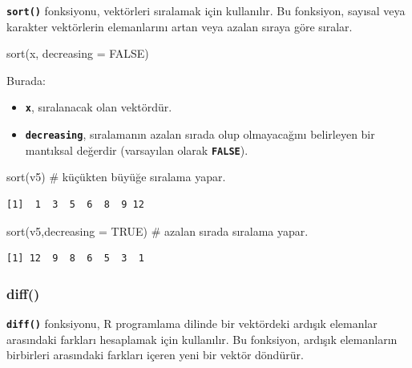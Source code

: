 \documentclass[
  letterpaper,
  DIV=11,
  numbers=noendperiod]{scrreprt}
\newenvironment{Shaded}{\begin{snugshade}}{\end{snugshade}}
\newcommand{\AttributeTok}[1]{\textcolor[rgb]{0.40,0.45,0.13}{#1}}
\newcommand{\CommentTok}[1]{\textcolor[rgb]{0.37,0.37,0.37}{#1}}
\newcommand{\ConstantTok}[1]{\textcolor[rgb]{0.56,0.35,0.01}{#1}}
\newcommand{\FunctionTok}[1]{\textcolor[rgb]{0.28,0.35,0.67}{#1}}
\newcommand{\NormalTok}[1]{\textcolor[rgb]{0.00,0.23,0.31}{#1}}
\begin{document}
\textbf{\texttt{sort()}} fonksiyonu, vektörleri sıralamak için
kullanılır. Bu fonksiyon, sayısal veya karakter vektörlerin elemanlarını
artan veya azalan sıraya göre sıralar.

\begin{Shaded}
\begin{Highlighting}[]
\FunctionTok{sort}\NormalTok{(x, }\AttributeTok{decreasing =} \ConstantTok{FALSE}\NormalTok{)}
\end{Highlighting}
\end{Shaded}

Burada:

\begin{itemize}
\item
  \textbf{\texttt{x}}, sıralanacak olan vektördür.
\item
  \textbf{\texttt{decreasing}}, sıralamanın azalan sırada olup
  olmayacağını belirleyen bir mantıksal değerdir (varsayılan olarak
  \textbf{\texttt{FALSE}}).
\end{itemize}

\begin{Shaded}
\begin{Highlighting}[]
\FunctionTok{sort}\NormalTok{(v5) }\CommentTok{\# küçükten büyüğe sıralama yapar.}
\end{Highlighting}
\end{Shaded}

\begin{verbatim}
[1]  1  3  5  6  8  9 12
\end{verbatim}

\begin{Shaded}
\begin{Highlighting}[]
\FunctionTok{sort}\NormalTok{(v5,}\AttributeTok{decreasing =} \ConstantTok{TRUE}\NormalTok{) }\CommentTok{\# azalan sırada sıralama yapar.}
\end{Highlighting}
\end{Shaded}

\begin{verbatim}
[1] 12  9  8  6  5  3  1
\end{verbatim}

\hypertarget{diff}{%
\subsubsection{diff()}\label{diff}}

\textbf{\texttt{diff()}} fonksiyonu, R programlama dilinde bir
vektördeki ardışık elemanlar arasındaki farkları hesaplamak için
kullanılır. Bu fonksiyon, ardışık elemanların birbirleri arasındaki
farkları içeren yeni bir vektör döndürür.
\end{document}
